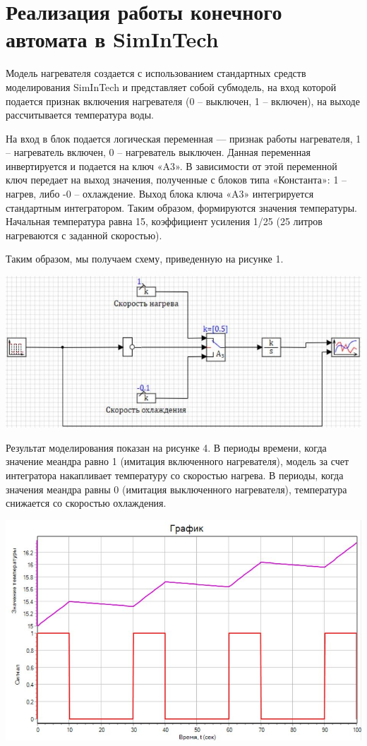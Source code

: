\documentclass{article}
\begin{document}
\section{Реализация работы конечного автомата в SimInTech}

Модель нагревателя создается с использованием стандартных средств моделирования SimInTech и представляет собой субмодель, на вход которой подается признак включения нагревателя (0 – выключен, 1 – включен), на выходе рассчитывается температура воды.

На вход в блок подается логическая переменная — признак работы нагревателя, 1 – нагреватель включен, 0 – нагреватель выключен. Данная переменная инвертируется и подается на ключ «A3». В зависимости от этой переменной ключ передает на выход значения, полученные с блоков типа «Константа»: 1 – нагрев, либо -0 – охлаждение. Выход блока ключа «A3» интегрируется стандартным интегратором. Таким образом, формируются значения температуры. Начальная температура равна 15, коэффициент усиления 1/25 (25 литров нагреваются с заданной скоростью).

Таким образом, мы получаем схему, приведенную на рисунке 1.

\includegraphics[width=0.8\linewidth]{view_2.JPG}


Результат моделирования показан на рисунке 4. В периоды времени, когда значение меандра равно 1 (имитация включенного нагревателя), модель за счет интегратора накапливает температуру со скоростью нагрева. В периоды, когда значения меандра равны 0 (имитация выключенного нагревателя), температура снижается со скоростью охлаждения.

\includegraphics[width=0.75\linewidth]{view_1.JPG}
\end{document}
